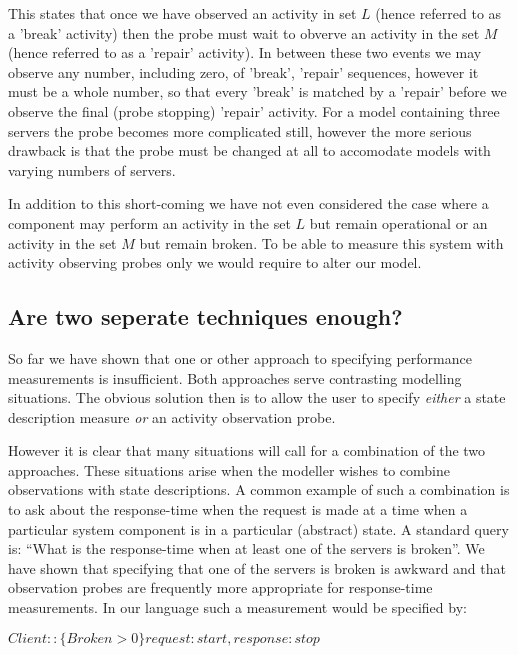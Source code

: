 \documentclass[times, 10pt,twocolumn]{article}
\newcommand{\showprobe}[1]{$#1$}
\begin{document}
This states that once we have observed an activity in set $L$
(hence referred to as a 'break' activity) then the probe must wait
to obverve an activity in the set $M$
(hence referred to as a 'repair' activity).
In between these two events we may observe any number,
including zero, of 'break', 'repair' sequences, however it must be a whole
number, so that every 'break' is matched by a 'repair' before we observe
the final (probe stopping) 'repair' activity.
For a model containing three servers the probe becomes more complicated
still, however the more serious drawback is that the probe must be changed
at all to accomodate models with varying numbers of servers.

In addition to this short-coming we have not even considered the case where a
component may perform an activity in the set $L$ but remain operational or
an activity in the set $M$ but remain broken. To be able to measure this system
with activity observing probes only we would require to alter our model.

\subsection{Are two seperate techniques enough?}

So far we have shown that one or other approach to specifying performance
measurements is insufficient. Both approaches serve contrasting modelling
situations. The obvious solution then is to allow the user to specify
\emph{either} a state description measure \emph{or}
an activity observation probe.

However it is clear that many situations will call for a combination of
the two approaches. These situations arise when the modeller wishes to
combine observations with state descriptions. A common example of such
a combination is to ask about the response-time when the request is made
at a time when a particular system component is in a particular (abstract)
state. A standard query is: 
``What is the response-time when at least one of the servers is broken''.
We have shown that specifying that one of the servers is broken is awkward
and that observation probes are frequently more appropriate for response-time
measurements. In our language such a measurement would be specified by:

\showprobe{Client::\{Broken > 0\}request:start, response:stop}


\end{document}
